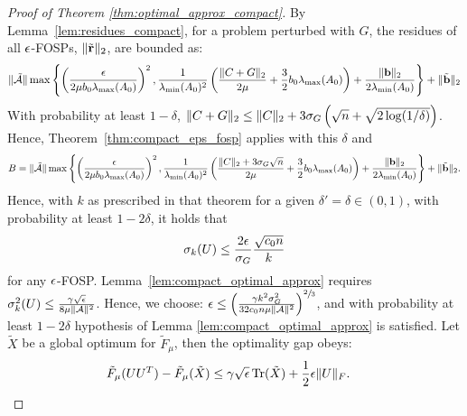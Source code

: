 \begin{proof}[Proof of Theorem \ref{thm:optimal_approx_compact}]
	
	By Lemma~\ref{lem:residues_compact}, for a problem perturbed with $G$, the residues of all $\epsilon$-FOSPs, $\|\tilde {\mathbf{r}}\|_2$, are bounded as:
	\begin{align*}
		\|\tilde {\mathcal{A}}\| \max\left\{ \left(\frac{\epsilon}{2\mu b_0 \lambda_{\max}(A_0)}\right)^2, \frac{1}{\lambda_{\min}(A_0)^2} \left(\frac{\|C+G\|_2}{2\mu} + \frac{3}{2}b_0 \lambda_{\max}(A_0)\right) + \frac{\|\mathbf{b}\|_2}{2\lambda_{\min}(A_0)} \right\} + \|\tilde {\mathbf{b}}\|_2
	\end{align*}
	With probability at least $1 - \delta$, $\|C + G\|_2 \leq \|C\|_2 + 3\sigma_G\left(\sqrt{n} + \sqrt{2\log(1/\delta)}\right)$. Hence, Theorem~\ref{thm:compact_eps_fosp} applies with this $\delta$ and
	\begin{align*}
		B = \|\tilde {\mathcal{A}}\| \max\left\{ \left(\frac{\epsilon}{2\mu b_0 \lambda_{\max}(A_0)}\right)^2, \frac{1}{\lambda_{\min}(A_0)^2} \left(\frac{\|C\|_2 + 3\sigma_G\sqrt{n}}{2\mu} + \frac{3}{2}b_0 \lambda_{\max}(A_0)\right) + \frac{\|\mathbf{b}\|_2}{2\lambda_{\min}(A_0)} \right\} + \|\tilde {\mathbf{b}}\|_2.
	\end{align*}
	Hence, with $k$ as prescribed in that theorem for a given $\delta' =\delta \in (0, 1)$, with probability at least $1 - 2\delta$, it holds that
	\begin{align*}
		\sigma_k(U) \leq \frac{ 2\epsilon}{\sigma_G } \frac{\sqrt{c_0 n}}{k}
	\end{align*}
	for any $\epsilon$-FOSP. Lemma~\ref{lem:compact_optimal_approx} requires $\sigma_k^2(U) \leq \frac{\gamma \sqrt{\epsilon}}{8 \mu\|\mathcal{A}\|^2}$. Hence, we choose: $\epsilon \leq \left(\frac{\gamma k^2 \sigma_G^2 }{ 32c_0 n  \mu \|\mathcal{A}\|^2}\right)^{\sfrac{2}{3}}$, and with probability at least $1-2\delta$  hypothesis of Lemma \ref{lem:compact_optimal_approx} is satisfied. Let $\tilde X$ be a global optimum for $\tilde F_\mu$, then the optimality gap obeys:
\begin{align*}
\tilde F_\mu(UU^T) - \tilde F_\mu(\tilde X) & \leq \gamma \sqrt{\epsilon} \operatorname{Tr}(\tilde X) + \frac{1}{2}\epsilon \|U\|_F.
\end{align*}
\end{proof}

